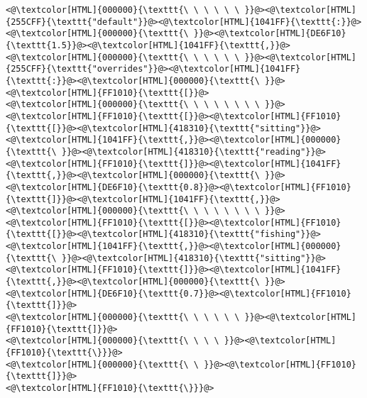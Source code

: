 \begin{lstlisting}
<@\textcolor[HTML]{000000}{\texttt{\ \ \ \ \ \ }}@><@\textcolor[HTML]{255CFF}{\texttt{"default"}}@><@\textcolor[HTML]{1041FF}{\texttt{:}}@><@\textcolor[HTML]{000000}{\texttt{\ }}@><@\textcolor[HTML]{DE6F10}{\texttt{1.5}}@><@\textcolor[HTML]{1041FF}{\texttt{,}}@>
<@\textcolor[HTML]{000000}{\texttt{\ \ \ \ \ \ }}@><@\textcolor[HTML]{255CFF}{\texttt{"overrides"}}@><@\textcolor[HTML]{1041FF}{\texttt{:}}@><@\textcolor[HTML]{000000}{\texttt{\ }}@><@\textcolor[HTML]{FF1010}{\texttt{[}}@>
<@\textcolor[HTML]{000000}{\texttt{\ \ \ \ \ \ \ \ }}@><@\textcolor[HTML]{FF1010}{\texttt{[}}@><@\textcolor[HTML]{FF1010}{\texttt{[}}@><@\textcolor[HTML]{418310}{\texttt{"sitting"}}@><@\textcolor[HTML]{1041FF}{\texttt{,}}@><@\textcolor[HTML]{000000}{\texttt{\ }}@><@\textcolor[HTML]{418310}{\texttt{"reading"}}@><@\textcolor[HTML]{FF1010}{\texttt{]}}@><@\textcolor[HTML]{1041FF}{\texttt{,}}@><@\textcolor[HTML]{000000}{\texttt{\ }}@><@\textcolor[HTML]{DE6F10}{\texttt{0.8}}@><@\textcolor[HTML]{FF1010}{\texttt{]}}@><@\textcolor[HTML]{1041FF}{\texttt{,}}@>
<@\textcolor[HTML]{000000}{\texttt{\ \ \ \ \ \ \ \ }}@><@\textcolor[HTML]{FF1010}{\texttt{[}}@><@\textcolor[HTML]{FF1010}{\texttt{[}}@><@\textcolor[HTML]{418310}{\texttt{"fishing"}}@><@\textcolor[HTML]{1041FF}{\texttt{,}}@><@\textcolor[HTML]{000000}{\texttt{\ }}@><@\textcolor[HTML]{418310}{\texttt{"sitting"}}@><@\textcolor[HTML]{FF1010}{\texttt{]}}@><@\textcolor[HTML]{1041FF}{\texttt{,}}@><@\textcolor[HTML]{000000}{\texttt{\ }}@><@\textcolor[HTML]{DE6F10}{\texttt{0.7}}@><@\textcolor[HTML]{FF1010}{\texttt{]}}@>
<@\textcolor[HTML]{000000}{\texttt{\ \ \ \ \ \ }}@><@\textcolor[HTML]{FF1010}{\texttt{]}}@>
<@\textcolor[HTML]{000000}{\texttt{\ \ \ \ }}@><@\textcolor[HTML]{FF1010}{\texttt{\}}}@>
<@\textcolor[HTML]{000000}{\texttt{\ \ }}@><@\textcolor[HTML]{FF1010}{\texttt{]}}@>
<@\textcolor[HTML]{FF1010}{\texttt{\}}}@>

\end{lstlisting}
